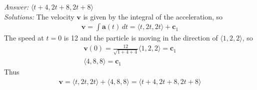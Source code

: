 \ifnum {} {\color{DarkBlue} \textit{Answer:} $\langle t+4, 2t+8, 2t+8 \rangle$ \\[12pt] \textit{Solutions:} The velocity $\mathbf v$ is given by the integral of the acceleration, so
    \begin{align}
        \mathbf v = \int \mathbf a(t) \, dt = \langle t, 2t, 2t\rangle + \mathbf c_1
    \end{align}
    The speed at $t=0$ is 12 and the particle is moving in the direction of $\langle 1,2,2\rangle$, so 
    \begin{align}
        \mathbf v(0) = \frac{12}{\sqrt{1+4+4}} \langle 1,2,2 \rangle = \mathbf c_1 \\
        \langle 4,8,8\rangle = \mathbf c_1
    \end{align}
    Thus
    \begin{align}
        \mathbf v = \langle t, 2t, 2t\rangle + \langle 4,8,8\rangle = \langle t+4, 2t+8, 2t+8 \rangle
    \end{align}
}
\else
  
\fi
\fi



\ifnum {}


